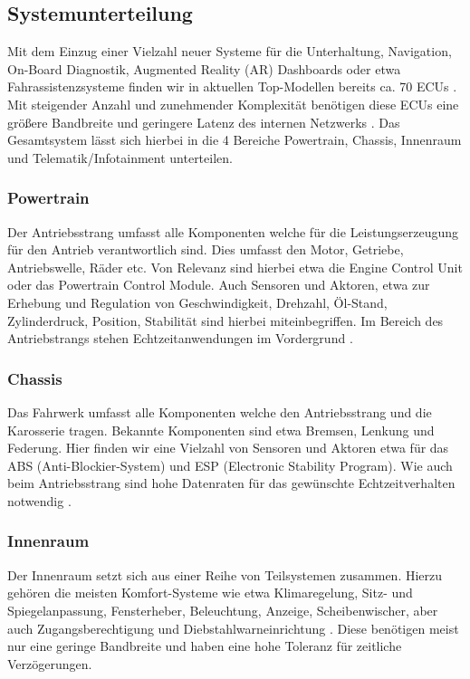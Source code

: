     \subsection{Systemunterteilung}
    Mit dem Einzug einer Vielzahl neuer Systeme für die Unterhaltung, Navigation, On-Board Diagnostik,
    Augmented Reality (AR) Dashboards oder etwa Fahrassistenzsysteme finden wir in aktuellen Top-Modellen bereits 
    ca. 70 ECUs \cite{TW_huang2018vehicle}. Mit steigender Anzahl und zunehmender Komplexität 
    benötigen diese ECUs eine größere Bandbreite und geringere Latenz des internen Netzwerks \cite{TW_huang2018vehicle}.
    Das Gesamtsystem lässt sich hierbei in die 4 Bereiche Powertrain, Chassis, Innenraum und Telematik/Infotainment unterteilen.
        \subsubsection{Powertrain}
        Der Antriebsstrang umfasst alle Komponenten welche für die Leistungserzeugung für den Antrieb verantwortlich sind. Dies umfasst 
        den Motor, Getriebe, Antriebswelle, Räder etc. Von Relevanz sind hierbei etwa die Engine Control Unit oder das Powertrain Control Module.
        Auch Sensoren und Aktoren, etwa zur Erhebung und Regulation von Geschwindigkeit, Drehzahl, Öl-Stand, Zylinderdruck, Position, Stabilität sind hierbei miteinbegriffen.
        Im Bereich des Antriebstrangs stehen Echtzeitanwendungen im Vordergrund \cite{reif2011bosch}\cite{TW_huang2018vehicle}.
        \subsubsection{Chassis}
        Das Fahrwerk umfasst alle Komponenten welche den Antriebsstrang und die Karosserie tragen. Bekannte Komponenten sind etwa
        Bremsen, Lenkung und Federung. Hier finden wir eine Vielzahl von Sensoren und Aktoren etwa für das ABS (Anti-Blockier-System) und ESP (Electronic Stability Program).
        Wie auch beim Antriebsstrang sind hohe Datenraten für das gewünschte Echtzeitverhalten notwendig \cite{TW_huang2018vehicle}.
        \subsubsection{Innenraum}
        Der Innenraum setzt sich aus einer Reihe von Teilsystemen zusammen. Hierzu gehören die meisten Komfort-Systeme wie etwa Klimaregelung, Sitz- und Spiegelanpassung, Fensterheber, Beleuchtung,
        Anzeige, Scheibenwischer, aber auch Zugangsberechtigung und Diebstahlwarneinrichtung \cite{reif2011bosch}. 
        Diese benötigen meist nur eine geringe Bandbreite und haben eine hohe Toleranz für zeitliche Verzögerungen.
